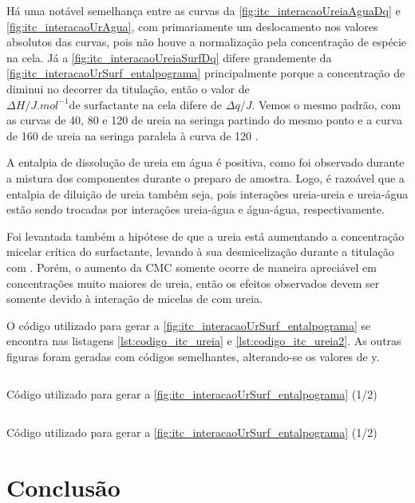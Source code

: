 	Há uma notável semelhança entre as curvas da \autoref{fig:itc_interacaoUreiaAguaDq} e \autoref{fig:itc_interacaoUrAgua}, com primariamente um deslocamento nos valores absolutos das curvas, pois não houve a normalização pela concentração de espécie na cela. Já a \autoref{fig:itc_interacaoUreiaSurfDq} difere grandemente da \autoref{fig:itc_interacaoUrSurf_entalpograma} principalmente porque a concentração de \TTAB{} diminui no decorrer da titulação, então o valor de \(\Delta H/J.mol^{-1} \text{de surfactante na cela}\) difere de \(\Delta q/J\). Vemos o mesmo padrão, com as curvas de 40, 80 e 120 \mM{} de ureia na seringa partindo do mesmo ponto e a curva de 160 \mM{} de ureia na seringa paralela à curva de 120 \mM.
	
	A entalpia de dissolução de ureia em água é positiva, como foi observado durante a mistura dos componentes durante o preparo de amostra. Logo, é razoável que a entalpia de diluição de ureia também seja, pois interações ureia-ureia e ureia-água estão sendo trocadas por interações ureia-água e água-água, respectivamente.
	
	Foi levantada também a hipótese de que a ureia está aumentando a concentração micelar crítica do surfactante, levando à sua desmicelização durante a titulação com \TTAB{}. Porém, o aumento da CMC somente ocorre de maneira apreciável em concentrações muito maiores de ureia, então os efeitos observados devem ser somente devido à interação de micelas de \TTAB{} com ureia.
	
	O código utilizado para gerar a \autoref{fig:itc_interacaoUrSurf_entalpograma} se encontra nas listagens \ref{lst:codigo_itc_ureia} e \ref{lst:codigo_itc_ureia2}. As outras figuras foram geradas com códigos semelhantes, alterando-se os valores de y.
	
	\begin{listing}[h]
		\inputminted{python}{./python/ITC_tratamento_ureia_ttab.py}
		\caption{Código utilizado para gerar a \autoref{fig:itc_interacaoUrSurf_entalpograma} (1/2)}
		\label{lst:codigo_itc_ureia}
	\end{listing}

	\begin{listing}[h]
		\inputminted{python}{./python/ITC_tratamento_ureia_ttab2.py}
		\caption{Código utilizado para gerar a \autoref{fig:itc_interacaoUrSurf_entalpograma} (1/2)}
		\label{lst:codigo_itc_ureia2}
	\end{listing}


	\FloatBarrier
	
	\section{Conclusão} 
	
